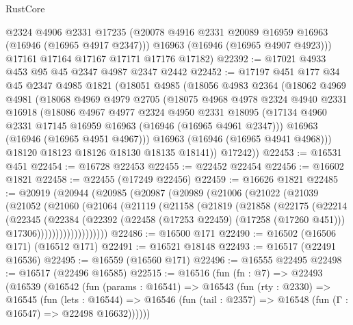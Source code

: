 \begin{lexlean}{RustCore}
\begin{coremodule}
        @2324
        @4906
        @2331
        @17235
        (@20078 @4916 @2331 @20089 @16959 @16963 (@16946 (@16965 @4917 @2347)))
        @16963
        (@16946 (@16965 @4907 @4923)))
      @17161
      @17164
      @17167
      @17171
      @17176
      @17182)
@22392 := @17021 @4933 @453 @95 @45 @2347 @4987 @2347 @2442
@22452 := @17197
    @451
    @177
    @34
    @45
    @2347
    @4985
    @1821
    (@18051
      @4985
      (@18056
        @4983
        @2364
        (@18062
          @4969
          @4981
          (@18068
            @4969
            @4979
            @2705
            (@18075
              @4968
              @4978
              @2324
              @4940
              @2331
              @16918
              (@18086
                @4967
                @4977
                @2324
                @4950
                @2331
                @18095
                (@17134 @4960 @2331 @17145 @16959 @16963 (@16946 (@16965 @4961 @2347)))
                @16963
                (@16946 (@16965 @4951 @4967)))
              @16963
              (@16946 (@16965 @4941 @4968)))
            @18120
            @18123
            @18126
            @18130
            @18135
            @18141))
        @17242))
@22453 := @16531 @451
@22454 := @16728 @22453
@22455 := @22452 @22454
@22456 := @16602 @1821
@22458 := @22455 (@17249 @22456)
@22459 := @16626 @1821
@22485 := @20919
    (@20944
      (@20985
        (@20987
          (@20989
            (@21006
              (@21022
                (@21039
                  (@21052
                    (@21060
                      (@21064
                        (@21119
                          (@21158
                            (@21819
                              (@21858
                                (@22175
                                  (@22214
                                    (@22345
                                      (@22384
                                        (@22392
                                          (@22458 (@17253 @22459) (@17258 (@17260 @451)))
                                          @17306)))))))))))))))))))
@22486 := @16500 @171
@22490 := @16502 (@16506 @171) (@16512 @171)
@22491 := @16521 @18148
@22493 := @16517 (@22491 @16536)
@22495 := @16559 (@16560 @171)
@22496 := @16555 @22495
@22498 := @16517 (@22496 @16585)
@22515 := @16516
    (fun (fn : @7) =>
    @22493
      (@16539
        (@16542
          (fun (params : @16541) =>
          @16543
            (fun (rty : @2330) =>
            @16545
              (fun (lets : @16544) =>
              @16546 (fun (tail : @2357) => @16548 (fun (Γ : @16547) => @22498 @16632))))))

\end{coremodule}
\end{lexlean}
